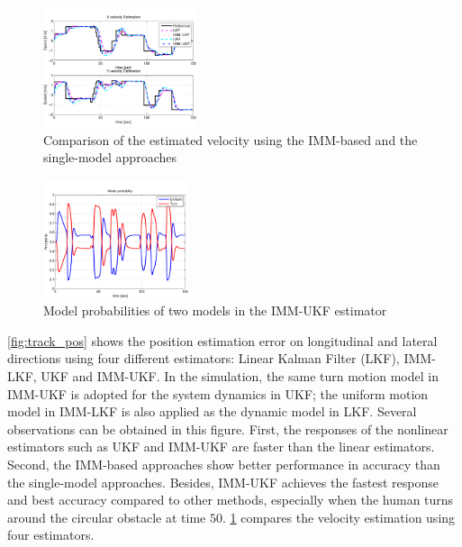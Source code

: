 \documentclass[letterpaper, 10 pt, conference]{ieeeconf}
\newcommand{\todonote}[1]{\vspace{0px} %
	\todo[inline, color=green!30]{\textbf{[Note:]} {#1}} %
}
\begin{document}
	\begin{figure}
		\centering
		\includegraphics[width=0.4\textwidth]{figures/VelocityComp}
		\caption{Comparison of the estimated velocity using the IMM-based and the single-model approaches}
		\label{fig:track_v}
	\end{figure}
	
	\begin{figure}
		\centering
		\includegraphics[width=0.38\textwidth]{figures/mode_prob}
		\caption{Model probabilities of two models in the IMM-UKF estimator}
		\label{fig:mode_prob}
	\end{figure}
	\cref{fig:track_pos} shows the position estimation error on longitudinal and lateral directions using four different estimators: Linear Kalman Filter (LKF), IMM-LKF, UKF and IMM-UKF. 
	In the simulation, the same turn motion model in IMM-UKF is adopted for the system dynamics in UKF; the uniform motion model in IMM-LKF is also applied as the dynamic model in LKF.  
	Several observations can be obtained in this figure. 
	First, the responses of the nonlinear estimators such as UKF and IMM-UKF are faster than the linear estimators. 
	Second, the IMM-based approaches show better performance in accuracy than the single-model approaches.
	Besides, IMM-UKF achieves the fastest response and best accuracy compared to other methods, especially when the human turns around the circular obstacle at time $50$.
	\cref{fig:track_v} compares the velocity estimation using four estimators.
\end{document}
